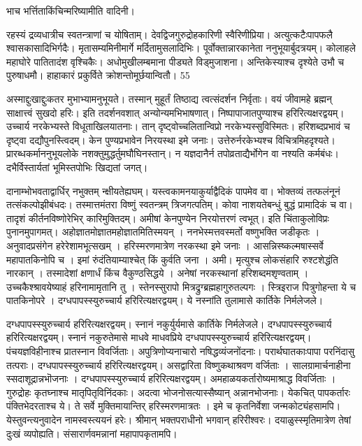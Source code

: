   भाच भर्त्तिताकिंचिन्मरिष्यामीति वादिनी।
 
रहस्यं द्रव्यधात्रीच स्वतन्त्राणां च योषिताम्।
 देवद्विजगुरुद्रोहकारिणी स्वैरिणीप्रिया।
 अत्युत्कटैःपापफलै श्वासकासादिभिर्गदैः।
 मृतासम्यमिनीमार्गे मर्दितामुसलादिभिः।
 पूर्वोक्तान्नारकानेता ननुभूयार्बुदत्रयम्।
 कोलाहले महाघोरे पातितादंश वृश्चिकैः।
 अधोमुखीलम्बमाना पीड्यते विड्मुजाशना।
 अन्तिकेस्याश्च दृश्येते उभौ च पुरुषाधमौ।
 हाहाकारं प्रकुर्विते क्रोशन्तोमूर्छयान्वितौ।
 55

  अस्माद्दुःखाद्दुःकतर मुभाभ्यामनुभूयते।
 तस्मान् मुहूर्तं तिष्ठाद्य त्वत्संदर्शन निर्वृताः।
 वयं जीवामहे ब्रह्मन् साक्षात्त्वं सुखदो हरिः।
 इति तदर्शनवशात् अन्योन्यमभिभाषणात्।
 निष्पापाजातपुण्याश्च हरिरित्यक्षरद्वयम्।
 उच्चार्य नरकेभ्यस्ते विधूताखिलयातनाः।
 तान् दृष्ट्वोच्चलितान्विप्रो नरकेभ्यस्सुविस्मितः।
 हरिशब्दप्रभावं च दृष्ट्वा दद्यौपुनस्त्विदम्।
 केन पुण्यप्रभावेन निरयस्था इमे जनाः।
 उत्तेरुर्नरकेभ्यश्च विचित्रमिहदृश्यते।
 प्रारब्धकर्माननुभूयलोके नशक्तुमुद्धर्तुमघौघिनस्तान्।
 न यज्ञदानैर्न तपोव्रताद्यैर्भोगेन वा नश्यति कर्मबंधः।
 दभैर्विस्तार्यतां भूमिस्तपोभिः खिद्यतां जगत्।
 
दानाम्भोभवताद्वार्धिर् नभुक्तम् न्क्षीयतेह्यघम्।
 यस्त्वकामनयाकुर्याद्वैदिकं पापमेव वा।
 भोक्तव्यं तत्फलंनूनं तत्संकल्पोझीबंधदः।
 तस्मात्तमंतरा विष्णुं स्वतन्त्रम् त्रिजगत्पतिम्।
 कोवा नाशयतेबन्धुं बुद्धं प्रामादिकं च वा।
 तादृशं कीर्तनविष्णोरेभिर् कारिमुक्तिदम्।
 अमीषां केनपुण्येन निरयोत्तरणं त्वभूत्।
 इति चिंताकुलोविप्रः पुनानमुपागमत्।
 अहोज्ञातमोज्ञातमहोज्ञातमितिस्मयन् ।
 ननभेस्मत्तवस्मर्तो वष्णुभक्ति जडीकृतः ।
 अनुवादप्रसंगेन हरेरेशामभूत्सखम् ।
 हरिस्मरणमात्रेण नरकस्था इमे जनाः ।
 आसन्निस्ष्कल्मषास्सर्वे महापातकिनोपि च ।
 इमां रुंदंतियाम्याश्चेत् किं कुर्वति जना ।
 अमी।
 मृत्युश्च लोकसंहारि रुश्टशेद्धंति नारकान् ।
 तस्मादेशां क्षणार्धं किंच वैकुण्ठसिद्धये ।
 अनेषां नरकस्थानां हरिशब्दमशृण्वताम् ।
 उच्चकैश्श्रावयेष्याहं हरिनामामृतानि तु ।
 स्तेनस्सुरापो मित्रद्रुग्ब्रह्महागुरुतल्पगः ।
 स्त्रिइराज पित्रुगोहन्ता ये च पातकिनोपरे ।
 दग्धपापस्स्युरुच्चार्य हरिरित्यक्षरद्वयम्।
 ये नस्नांति तुलामासे कार्तिके निर्मलेजले।
 
दग्धपापस्स्युरुच्चार्य हरिरित्यक्षरद्वयम्।
 स्नानं नकुर्युर्यमासे कार्तिके निर्मलेजले।
 दग्धपापस्स्युरुच्चार्य हरिरित्यक्षरद्वयम्।
 स्नानं नकुरुतेमासे माधवे माधवप्रिये दग्धपापस्स्युरुच्चार्य हरिरित्यक्षरद्वयम्।
 पंचयज्ञविहीनाश्च प्रातस्नान विवर्जिताः।
 अपुत्रिणोप्यनाचारो नषिद्धव्यंजनोंदनाः।
 परार्थघातकाःपापा परनिंदासु तत्पराः।
 दग्धपापस्स्युरुच्चार्य हरिरित्यक्षरद्वयम्।
 असद्वारिता विष्णुकथाश्रवण वर्जिताः ।
 सालग्रामार्चनाहीना स्सदाशूद्रान्नभॊजनाः ।
 दग्धपापस्स्युरुच्चार्य हरिरित्यक्षरद्वयम्।
 अमहाळयकर्तारोष्यमाश्राद्ध विवर्जिताः ।
 गुरुद्रोहः कृतघ्नाश्च मातृपितृविनिंदकाः।
 अदत्वा भोजनोसत्यास्सैष्यान् अन्नानभोजनाः।
 येकचित् पापकर्तारः पंक्तिभेदरताश्च ये।
 ते सर्वे मुक्तिमायान्तिर् हरिस्मरणमात्रतः ।
 इमे च कृतनिर्वेशा जन्मकोट्यंहसामपि।
 येस्तुवन्त्यनुवादेन नामस्वस्त्ययनं हरेः।
 श्रीमान् भक्तपराधीनो भगवान् हरिरीश्वरः।
 दयाळुस्स्मृतिमात्रेण तेषां दुःखं व्यपोह्यति।
 संसारार्णवमन्नानां महापापकृतामपि।
 
